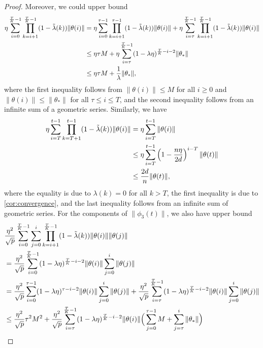 \begin{proof}
    Moreover, we could upper bound
    \begin{align*}
        \eta\sum_{i=0}^{\frac{T}{K}-1}\prod_{k=i+1}^{\frac{T}{K}-1}(1-\tilde{\lambda}(k)) \|\theta(i)\| & = \eta\sum_{i=0}^{\tau-1}\prod_{k=i+1}^{\tau-1}(1-\tilde{\lambda}(k)) \|\theta(i)\| + \eta\sum_{i=\tau}^{\frac{T}{K}-1}\prod_{k=i+1}^{\frac{T}{K}-1}(1-\tilde{\lambda}(k)) \|\theta(i)\| \\
        & \leq \eta\tau M + \eta\sum_{i=\tau}^{\frac{T}{K}-1}(1 - \lambda\eta)^{\frac{T}{K}-i-2} \|\theta_*\| \\
        & \leq \eta\tau M + \frac{1}{\lambda} \|\theta_*\|,
    \end{align*}
    where the first inequality follows from $\|\theta(i)\|\leq M$ for all $i\geq 0$ and $\|\theta(i)\|\leq \|\theta_*\|$ for all $\tau\leq i\leq T$, and the second inequality follows from an infinite sum of a geometric series. Similarly, we have
    \begin{align*}
        \eta\sum_{i=T}^{t-1} \prod_{k=T+1}^{t-1}(1-\tilde{\lambda}(k)) \|\theta(i)\| & = \eta\sum_{i=T}^{t-1} \|\theta(i)\| \\
        & \leq \eta \sum_{i=T}^{t-1} \left( 1-\frac{n\eta}{2d} \right)^{i-T} \|\theta(t)\| \\
        & \leq \frac{2d}{n} \|\theta(t)\|,
    \end{align*}
    where the equality is due to $\lambda(k) = 0$ for all $k > T$, the first inequality is due to \cref{cor:convergence}, and the last inequality follows from an infinite sum of geometric series. For the components of $\|\phi_{3}(t)\|$, we also have upper bound 
    \begin{align*}
        & \frac{\eta^2}{\sqrt p}\sum_{i=0}^{\frac{T}{K}-1}\sum_{j=0}^i\prod_{k=i+1}^{\frac{T}{K}-1}(1-\tlam(k)) \|\theta(i)\|\|\theta(j)\| \\
        & = \frac{\eta^2}{\sqrt p}\sum_{i=0}^{\frac{T}{K}-1}(1 - \lambda\eta)^{\frac{T}{K}-i-2} \|\theta(i)\| \sum_{j=0}^i \|\theta(j)\| \\
        & = \frac{\eta^2}{\sqrt p}\sum_{i=0}^{\tau-1}(1 - \lambda\eta)^{\tau-i-2} \|\theta(i)\| \sum_{j=0}^i \|\theta(j)\| + \frac{\eta^2}{\sqrt p}\sum_{i=\tau}^{\frac{T}{K}-1}(1 - \lambda\eta)^{\frac{T}{K}-i-2} \|\theta(i)\| \sum_{j=0}^i \|\theta(j)\| \\
        & \leq \frac{\eta^2}{\sqrt p} \tau^2 M^2 + \frac{\eta^2}{\sqrt p}\sum_{i=\tau}^{\frac{T}{K}-1}(1 - \lambda\eta)^{\frac{T}{K}-i-2} \|\theta(i)\| \Big( \sum_{j=0}^{\tau-1} M + \sum_{j=\tau}^{i} \|\theta_*\| \Big) \\

\end{align*}
\end{proof}
